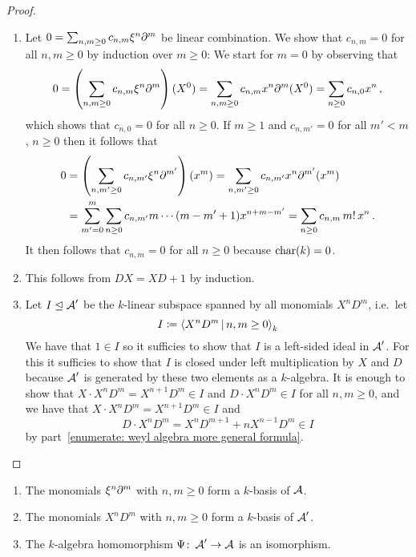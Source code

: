 \begin{proof}
  \leavevmode
  \begin{enumerate}
    \item
      Let $0 = \sum_{n, m \geq 0} c_{n,m} \xi^n \partial^m$ be linear combination.
      We show that $c_{n,m} = 0$ for all $n, m \geq 0$ by induction over $m \geq 0$:
      We start for $m = 0$ by observing that
      \[
          0
        = \left( \sum_{n, m \geq 0} c_{n,m} \xi^n \partial^m \right)(X^0)
        = \sum_{n, m \geq 0} c_{n,m} x^n \partial^m(X^0)
        = \sum_{n \geq 0} c_{n,0} x^n \,,
      \]
      which shows that $c_{n,0} = 0$ for all $n \geq 0$.
      If $m \geq 1$ and $c_{n,m'} = 0$ for all $m' < m$, $n \geq 0$ then it follows that
      \begin{align*}
            0
        &=  \left( \sum_{n, m' \geq 0} c_{n,m'} \xi^n \partial^{m'} \right)(x^m)
         =  \sum_{n, m' \geq 0} c_{n,m'} x^n \partial^{m'}(x^m)
        \\
        &=  \sum_{m'=0}^m \sum_{n \geq 0} c_{n,m'} m \dotsm (m-m'+1) x^{n+m-m'}
         =  \sum_{n \geq 0} c_{n,m} \, m! \, x^n \,.
      \end{align*}
      It then follows that $c_{n,m} = 0$ for all $n \geq 0$ because $\operatorname{char}(k) = 0$.
    \item
      This follows from $DX = XD + 1$ by induction.
    \item
      Let $I \trianglelefteq \operatorname{\mathcal{A}}'$ be the $k$-linear subspace spanned by all monomials $X^n D^m$, i.e.\ let
      \[
                  I
        \defined  \gen{
                    X^n D^m
                  \suchthat
                    n, m \geq 0
                  }_k
      \]
      We have that $1 \in I$ so it sufficies to show that $I$ is a left-sided ideal in $\operatorname{\mathcal{A}}'$.
      For this it sufficies to show that $I$ is closed under left multiplication by $X$ and $D$ because $\operatorname{\mathcal{A}}'$ is generated by these two elements as a $k$-algebra.
      It is enough to show that $X \cdot X^n D^m = X^{n+1} D^m \in I$ and $D \cdot X^n D^m \in I$ for all $n, m \geq 0$, and we have that $X \cdot X^n D^m = X^{n+1} D^m \in I$ and
      \[
            D \cdot X^n D^m
        =   X^n D^{m+1} + n X^{n-1} D^m
        \in I
      \]
      by part~\ref*{enumerate: weyl algebra more general formula}.
    \qedhere
  \end{enumerate}
\end{proof}


\begin{corollary}
  \label{corollary: monomials are basis of weyl algebra}
  \leavevmode
  \begin{enumerate}
    \item
      The monomials $\xi^n \partial^m$ with $n, m \geq 0$ form a $k$-basis of $\operatorname{\mathcal{A}}$.
    \item
      The monomials $X^n D^m$ with $n, m \geq 0$ form a $k$-basis of $\operatorname{\mathcal{A}}'$.
    \item
      The $k$-algebra homomorphism $\Psi \colon \operatorname{\mathcal{A}}' \to \operatorname{\mathcal{A}}$ is an isomorphism.
  \end{enumerate}
\end{corollary}


